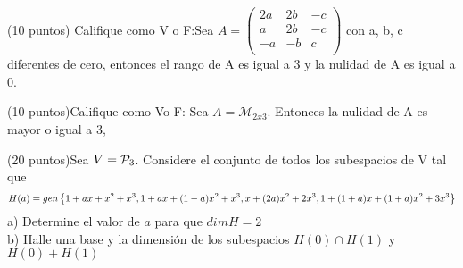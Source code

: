\begin{enumerate}
\newpage
\begin{prob}
(10 puntos) Califique como V o F:Sea $A=\left(\begin{matrix}
2a&2b&-c\\
a&2b&-c\\
-a&-b&c\\
\end{matrix}\right)$ con a, b, c diferentes de cero, entonces el rango de A es igual a 3 y la nulidad de A es igual a 0.
\end{prob}

\newpage

\begin{prob}
(10 puntos)Califique como Vo F: Sea $A=\mathcal{M}_{2x3}$. Entonces la nulidad de A es mayor o igual a 3,
\end{prob}



\newpage
\begin{prob}
(20 puntos)Sea $V=\mathcal{P}_3$. Considere el conjunto de todos los subespacios de V tal que $$H(a)=gen \left\{1+ax+x^2+x^3, 1+ax+(1-a)x^2+x^3, x+(2a)x^2+2x^3, 1+(1+a)x+(1+a)x^2+3x^3 \right\} $$
a) Determine el valor de $a$ para que $dimH=2$ \\
b) Halle una base y la dimensión de los subespacios $H(0)\cap H(1)$ y $H(0)+ H(1)$
\end{prob}


\newpage

\newpage



\end{enumerate}
